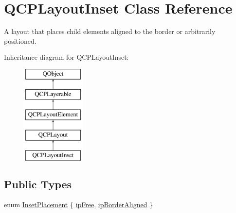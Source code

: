 \hypertarget{class_q_c_p_layout_inset}{}\section{Q\+C\+P\+Layout\+Inset Class Reference}
\label{class_q_c_p_layout_inset}


A layout that places child elements aligned to the border or arbitrarily positioned.  


Inheritance diagram for Q\+C\+P\+Layout\+Inset\+:\begin{figure}[H]
\begin{center}
\leavevmode
\includegraphics[height=5.000000cm]{class_q_c_p_layout_inset}
\end{center}
\end{figure}
\subsection*{Public Types}
\begin{DoxyCompactItemize}
\item 
enum \hyperlink{class_q_c_p_layout_inset_a8b9e17d9a2768293d2a7d72f5e298192}{Inset\+Placement} \{ \hyperlink{class_q_c_p_layout_inset_a8b9e17d9a2768293d2a7d72f5e298192aa4802986ea2cea457f932b115acba59e}{ip\+Free}, 
\hyperlink{class_q_c_p_layout_inset_a8b9e17d9a2768293d2a7d72f5e298192aa81e7df4a785ddee2229a8f47c46e817}{ip\+Border\+Aligned}
 \}
\end{DoxyCompactItemize}
